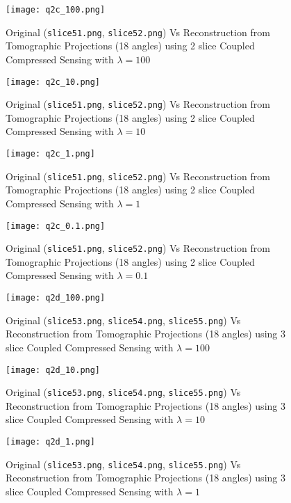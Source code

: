 \documentclass[fleqn, 11pt]{article}
\begin{document}
\begin{figure}[H]
    \centering
    \texttt{[image: q2c\_100.png]}
    \caption{Original (\texttt{slice51.png}, \texttt{slice52.png}) Vs Reconstruction from Tomographic Projections (18 angles) using 2 slice Coupled Compressed Sensing with $\lambda = 100$}
\end{figure}
\begin{figure}[H]
    \centering
    \texttt{[image: q2c\_10.png]}
    \caption{Original (\texttt{slice51.png}, \texttt{slice52.png}) Vs Reconstruction from Tomographic Projections (18 angles) using 2 slice Coupled Compressed Sensing with $\lambda = 10$}
\end{figure}
\begin{figure}[H]
    \centering
    \texttt{[image: q2c\_1.png]}
    \caption{Original (\texttt{slice51.png}, \texttt{slice52.png}) Vs Reconstruction from Tomographic Projections (18 angles) using 2 slice Coupled Compressed Sensing with $\lambda = 1$}
\end{figure}
\begin{figure}[H]
    \centering
    \texttt{[image: q2c\_0.1.png]}
    \caption{Original (\texttt{slice51.png}, \texttt{slice52.png}) Vs Reconstruction from Tomographic Projections (18 angles) using 2 slice Coupled Compressed Sensing with $\lambda = 0.1$}
\end{figure}

\begin{figure}[H]
    \centering
    \texttt{[image: q2d\_100.png]}
    \caption{Original (\texttt{slice53.png}, \texttt{slice54.png}, \texttt{slice55.png}) Vs Reconstruction from Tomographic Projections (18 angles) using 3 slice Coupled Compressed Sensing with $\lambda = 100$}
\end{figure}
\begin{figure}[H]
    \centering
    \texttt{[image: q2d\_10.png]}
    \caption{Original (\texttt{slice53.png}, \texttt{slice54.png}, \texttt{slice55.png}) Vs Reconstruction from Tomographic Projections (18 angles) using 3 slice Coupled Compressed Sensing with $\lambda = 10$}
\end{figure}
\begin{figure}[H]
    \centering
    \texttt{[image: q2d\_1.png]}
    \caption{Original (\texttt{slice53.png}, \texttt{slice54.png}, \texttt{slice55.png}) Vs Reconstruction from Tomographic Projections (18 angles) using 3 slice Coupled Compressed Sensing with $\lambda = 1$}
\end{figure}
\end{document}
